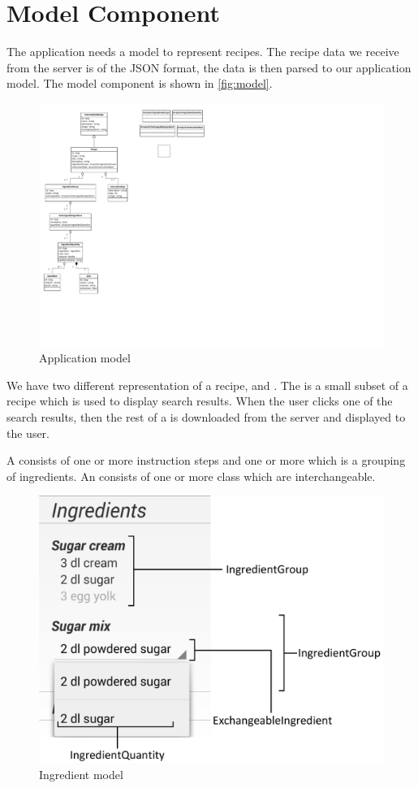 \pagebreak
\section{Model Component}

The application needs a model to represent recipes. The recipe data we receive from the server is of the JSON format, the data is then parsed to our application model. The model component is shown in \autoref{fig:model}.

\begin{figure}[H]
\centering
\includegraphics[width=0.67\linewidth, page=2]{img/model.pdf}
\caption{Application model}
\label{fig:model}
\end{figure}

We have two different representation of a recipe,  and . The  is a small subset of a recipe which is used to display search results. When the user clicks one of the search results, then the rest of a  is downloaded from the server and displayed to the user.

A  consists of one or more instruction steps and one or more  which is a grouping of ingredients. An  consists of one or more  class which are interchangeable. 

\begin{figure}[H]
\centering
\includegraphics[width=0.6\linewidth]{img/ingredients.pdf}
\caption{Ingredient model}
\label{fig:ingredients}
\end{figure}

